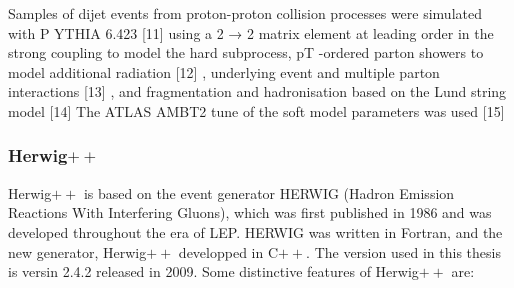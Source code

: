Samples of dijet events from proton-proton collision processes were simulated with P YTHIA 6.423
[11]%
 using a 2 → 2 matrix element at leading order in the strong coupling to model the hard subprocess,
pT -ordered parton showers to model additional radiation [12]%
, underlying event and multiple parton interactions [13]%
, and fragmentation and hadronisation based on the Lund string model [14]%
The ATLAS
AMBT2 tune of the soft model parameters was used [15]%





\subsubsection{Herwig$++$}

Herwig$++$ is based on the event generator HERWIG (Hadron Emission Reactions With Interfering Gluons), which was first published in 1986 and was developed throughout the era of LEP.  HERWIG was written in Fortran, and the new generator, Herwig$++$ developped in C$++$. The version used in this thesis is versin 2.4.2 released in 2009. Some distinctive features of Herwig$++$ are:

